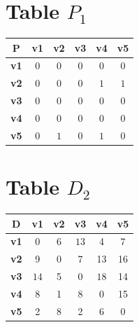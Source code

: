 \documentclass{article}
\begin{document}
\section{Table $P_{1}$}
\begin{center}
    \begin{tabular}{|c||c|c|c|c|c|}
        \hline
        \textbf{P} & \textbf{v1} & \textbf{v2} & \textbf{v3} & \textbf{v4} & \textbf{v5} \\
        \hline
        \hline
        \textbf{v1}& 0 & 0 & 0 & 0 & 0 \\
        \hline
        \textbf{v2}& 0 & 0 & 0 & \cellcolor[HTML]{D74894}$1$ & \cellcolor[HTML]{D74894}$1$ \\
        \hline
        \textbf{v3}& 0 & 0 & 0 & 0 & 0 \\
        \hline
        \textbf{v4}& 0 & 0 & 0 & 0 & 0 \\
        \hline
        \textbf{v5}& 0 & \cellcolor[HTML]{D74894}$1$ & 0 & \cellcolor[HTML]{D74894}$1$ & 0 \\
        \hline
    \end{tabular}
\end{center}


\section{Table $D_{2}$}
\begin{center}
    \begin{tabular}{|c||c|c|c|c|c|}
        \hline
        \textbf{D} & \textbf{v1} & \textbf{v2} & \textbf{v3} & \textbf{v4} & \textbf{v5} \\
        \hline
        \hline
        \textbf{v1}& 0 & 6 & \cellcolor[HTML]{D74894}$13$ & 4 & 7 \\
        \hline
        \textbf{v2}& 9 & 0 & 7 & 13 & 16 \\
        \hline
        \textbf{v3}& \cellcolor[HTML]{D74894}$14$ & 5 & 0 & \cellcolor[HTML]{D74894}$18$ & 14 \\
        \hline
        \textbf{v4}& 8 & 1 & \cellcolor[HTML]{D74894}$8$ & 0 & 15 \\
        \hline
        \textbf{v5}& 2 & 8 & 2 & 6 & 0 \\
        \hline
    \end{tabular}
\end{center}
\end{document}
